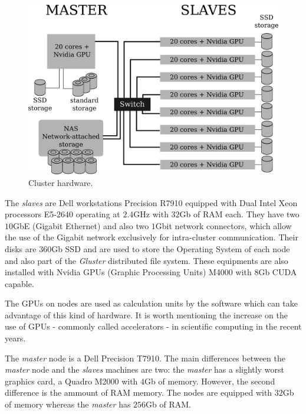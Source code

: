 \documentclass[twoside,a4paper,12pt,english]{inac19}
\begin{document}
\begin{figure}[h] %
  \centering\includegraphics[scale=0.7]{images/cluster-topologico.png}
  \caption{Cluster hardware.}
  \label{fig:cluster}
\end{figure}

The \textit{slaves} are Dell workstations Precision R7910 equipped
with Dual Intel{\textregistered} Xeon{\textregistered} processors E5-2640 operating at $2.4$GHz with
$32$Gb of RAM each. They have two $10$GbE (Gigabit Ethernet) and also two $1$Gbit network connectors, which
allow the use of the Gigabit network exclusively for intra-cluster communication. Their disks are $360$Gb SSD
and are used to store the Operating System of each node and also part of the \textit{Gluster} distributed
file system. These equipments are also installed with Nvidia{\textregistered} GPUs (Graphic Processing Units) M4000{\textregistered} with $8$Gb CUDA\cite{CUDA} capable.

The GPUs on nodes are used as calculation units by the software which can take advantage of this kind of hardware.
It is worth mentioning the increase on the use of GPUs - commonly called accelerators - in scientific computing
in the recent years\cite{accelerators}.

The \textit{master} node is a Dell Precision T7910. The main
differences between the \textit{master} node and the \textit{slaves} machines are two: the \textit{master} has
a slightly worst graphics card, a Quadro{\textregistered} M2000 with $4$Gb of memory. However, the second difference
is the ammount of RAM memory. The nodes are equipped with $32$Gb of memory whereas the \textit{master} has
$256$Gb of RAM.
\end{document}
